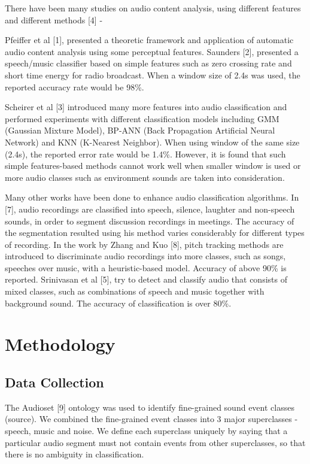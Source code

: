 \documentclass{article}
\begin{document}
There have been many studies on audio content analysis, using different features and different methods [4] - 

Pfeiffer et al [1], presented a theoretic framework and application of automatic audio content analysis using some perceptual features. Saunders [2], presented a speech/music classifier based on simple features such as zero crossing rate and short time energy for radio broadcast. When a window size of 2.4s was used, the reported accuracy rate would be 98\%.  

Scheirer et al [3] introduced many more features into audio classification and performed experiments with different classification models including GMM (Gaussian Mixture Model), BP-ANN (Back Propagation Artificial Neural Network) and KNN (K-Nearest Neighbor). When using window of the same size (2.4s), the reported error rate would be 1.4\%. However, it is found that such simple features-based methods cannot work well when smaller window is used or more audio classes such as environment sounds are taken into consideration.  

Many other works have been done to enhance audio classification algorithms. In [7], audio recordings are classified into speech, silence, laughter and non-speech sounds, in order to segment discussion recordings in meetings. The accuracy of the segmentation resulted using his method varies considerably for different types of recording. In the work by Zhang and Kuo [8], pitch tracking methods are introduced to discriminate audio recordings into more classes, such as songs, speeches over music, with a heuristic-based model. Accuracy of above 90\% is reported. Srinivasan et al [5], try to detect and classify audio that consists of mixed classes, such as combinations of speech and music together with background sound. The accuracy of classification is over 80\%. 

\section{Methodology}

\subsection{Data Collection}
The Audioset [9] ontology was used to identify fine-grained sound event classes (source). We combined the fine-grained event classes into 3 major superclasses - speech, music and noise. We define each superclass uniquely by saying that a particular audio segment must not contain events from other superclasses, so that there is no ambiguity in classification. 
\end{document}
